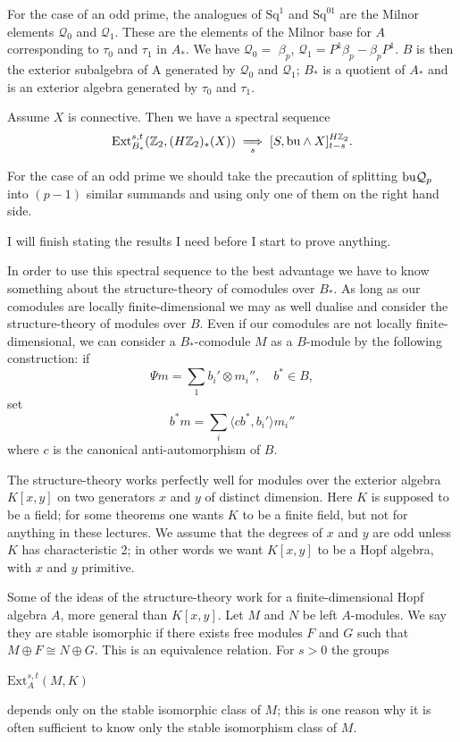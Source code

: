 \documentclass[../main]{subfiles}
\begin{document}
For the case of an odd prime, the analogues of $\mathrm{Sq}^{1}$ and $\mathrm{Sq}^{01}$ are the Milnor elements $\mathcal{Q}_{0}$ and $\mathcal{Q}_{1}$. These are the elements of the Milnor base for $A$ corresponding to $\tau_{0}$ and $\tau_{1}$ in $A_{\ast}$. We have $\mathcal{Q}_{0}=$ $\beta_{p}$, $\mathcal{Q}_{1}=P^{1}\beta_{p}-\beta_{p}P^{1}$. $B$ is then the exterior subalgebra of A generated by $\mathcal{Q}_{0}$ and $\mathcal{Q}_{1}$; $B_{\ast}$ is a quotient of $A_{\ast}$ and is an exterior algebra generated by $\tau_{0}$ and $\tau_{1}$.

\qquad \begin{proposition} \label{prop:p3ch16.1} Assume $X$ is connective. Then we have a spectral sequence
\begin{equation*}
    \mathrm{Ext}_{B_\ast}^{s,t}(\mathbb{Z}_2,(H\mathbb{Z}_2)_\ast(X)) \underset{s}{\implies} [S,\mathrm{bu}\wedge X]_{t-s}^{H\mathbb{Z}_2}.
\end{equation*}
\end{proposition}
    For the case of an odd prime we should take the precaution of splitting $\mathrm{bu}\mathcal{Q}_{p}$ into $(p-1)$ similar summands and using only one of them on the right hand side.
    
    I will finish stating the results I need before I start to prove anything. 
    
    In order to use this spectral sequence to the best advantage we have to know something about the structure-theory of comodules over $B_{\ast}$. As long as our comodules are locally finite-dimensional we may as well dualise and consider the structure-theory of modules over $B$. Even if our comodules are not locally finite-dimensional, we can consider a $B_{\ast}$-comodule $M$ as a $B$-module by the following construction: if \[
        \Psi m= \sum_{1} b_{i}' \otimes m_{i}'', \quad b^{\ast} \in B, 
    \]
    set
    \[
        b^{\ast}m=\sum_{i} \langle cb^{\ast}, b_{i}'\rangle m_{i}''
    \]
    where $c$ is the canonical anti-automorphism of $B$.
    
    The structure-theory works perfectly well for modules over the exterior algebra $K[x, y]$ on two generators $x$ and $y$ of distinct dimension. Here $K$ is supposed to be a field; for some theorems one wants $K$ to be a finite field, but not for anything in these lectures. We assume that the degrees of $x$ and $y$ are odd unless $K$ has characteristic 2; in other words we want $K[x, y]$ to be a Hopf algebra, with $x$ and $y$ primitive.
    
    Some of the ideas of the structure-theory work for a finite-dimensional Hopf algebra $A$, more general than $K[x, y]$. Let $M$ and $N$ be left $A$-modules. We say they are stable isomorphic if there exists free modules $F$ and $G$ such that $M\oplus F \cong N \oplus G$. This is an equivalence relation. For $s>0$ the groups \begin{center}
         $\mathrm{Ext}_{A}^{s, t} (M, K)$
    \end{center}
    depends only on the stable isomorphic class of $M$; this is one reason why it is often sufficient to know only the stable isomorphism class of $M$. 
    
\end{document}

